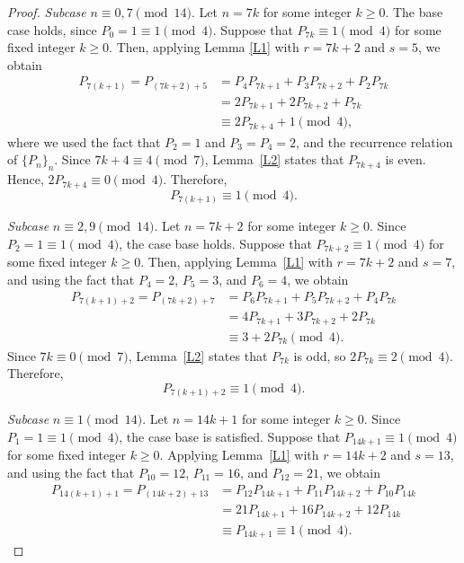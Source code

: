 \documentclass[11pt,a4paper]{article}
\numberwithin{equation}{section}
\numberwithin{table}{section}
\numberwithin{figure}{section}
\begin{document}
\begin{proof}
	\smallskip
	\textit{Subcase} $n\equiv 0,7\pmod{14}$. Let $n=7k$ for some integer 
	$k\ge 0$. The base case holds, since $P_0=1\equiv 1\pmod{4}$. 
	Suppose that $P_{7k}\equiv 1\pmod{4}$ for some fixed integer
	$k\ge 0$. Then, applying Lemma \ref{L1} with $r=7k+2$ and $s=5$, we obtain
	\begin{align*}
		P_{7(k+1)} = P_{(7k+2)+5} 
		&= P_{4}P_{7k+1} + P_{3}P_{7k+2} 
		+ P_{2}P_{7k}\\
		&= 2P_{7k+1}+2P_{7k+2}+P_{7k}\\
		&\equiv 2P_{7k+4}+1\pmod{4},
	\end{align*}
	where we used the fact that $P_2=1$ and $P_3=P_4=2$, and the recurrence relation of $\{P_{n}\}_{n}$. Since $7k+4\equiv 4\pmod{7}$, 
	Lemma~\ref{L2} states that $P_{7k+4}$ is even. Hence, $2P_{7k+4}\equiv 0\pmod{4}$. Therefore,
	\begin{equation*}
		P_{7(k+1)}\equiv 1\pmod{4}.
	\end{equation*}
	
	\smallskip
	\textit{Subcase} $n\equiv 2,9\pmod{14}$. Let $n=7k+2$ for some integer 
	$k\ge 0$. Since $P_2=1\equiv 1\pmod{4}$, the case base holds. 
	Suppose that $P_{7k+2}\equiv 1\pmod{4}$ for some fixed integer $k\ge 0$. Then, 
	applying Lemma~\ref{L1} with $r=7k+2$ and $s=7$, and 
	using the fact that $P_4=2$, $P_5=3$, and $P_6=4$, we obtain
	\begin{align*}
		P_{7(k+1)+2} = P_{(7k+2)+7} 
		&= P_{6}P_{7k+1}+P_{5}P_{7k+2}
		+P_{4}P_{7k}\\
		&= 4P_{7k+1}+3P_{7k+2}+2P_{7k}\\
		&\equiv 3+2P_{7k}\pmod{4}.
	\end{align*}
	Since $7k\equiv 0\pmod{7}$, Lemma~\ref{L2} states that $P_{7k}$ 
	is odd, so $2P_{7k}\equiv 2\pmod{4}$. Therefore,
	\begin{equation*}
		P_{7(k+1)+2}\equiv 1\pmod{4}.
	\end{equation*}
	
	\smallskip
	\textit{Subcase} $n\equiv 1\pmod{14}$. Let $n=14k+1$ for some integer $k\ge 0$. Since $P_1=1\equiv 1\pmod{4}$, the case base is satisfied. Suppose that $P_{14k+1}\equiv 1\pmod{4}$ for some fixed integer $k\ge 0$. Applying 
	Lemma~\ref{L1} with $r=14k+2$ and $s=13$, and using the fact that 
	$P_{10}=12$, $P_{11}=16$, and $P_{12}=21$, we obtain
	\begin{align*}
		P_{14(k+1)+1} = P_{(14k+2)+13}
		&= P_{12}P_{14k+1}+P_{11}P_{14k+2}
		+P_{10}P_{14k}\\
		&= 21P_{14k+1}+16P_{14k+2}+12P_{14k}\\
		&\equiv P_{14k+1}\equiv 1\pmod{4}.
	\end{align*}
	

\end{proof}
\end{document}
